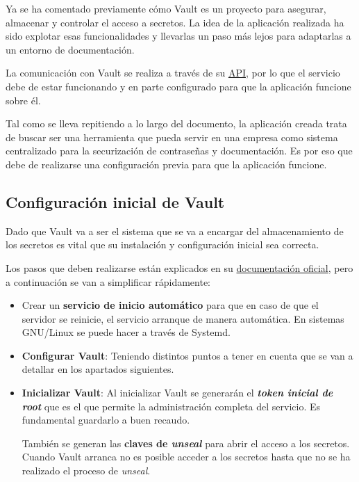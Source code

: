 \documentclass{\ClassPath/viu-tfm-template}
\begin{document}
Ya se ha comentado previamente cómo Vault es un proyecto para asegurar, almacenar y controlar el acceso a secretos. La idea de la aplicación realizada ha sido explotar esas funcionalidades y llevarlas un paso más lejos para adaptarlas a un entorno de documentación.

La comunicación con Vault se realiza a través de su \href{https://developer.hashicorp.com/vault/api-docs}{API}, por lo que el servicio debe de estar funcionando y en parte configurado para que la aplicación funcione sobre él.

Tal como se lleva repitiendo a lo largo del documento, la aplicación creada trata de buscar ser una herramienta que pueda servir en una empresa como sistema centralizado para la securización de contraseñas y documentación. Es por eso que debe de realizarse una configuración previa para que la aplicación funcione.

\subsection{Configuración inicial de Vault}

Dado que Vault va a ser el sistema que se va a encargar del almacenamiento de los secretos es vital que su instalación y configuración inicial sea correcta.

Los pasos que deben realizarse están explicados en su \href{https://developer.hashicorp.com/vault/tutorials/getting-started/getting-started-deploy}{documentación oficial}, pero a continuación se van a simplificar rápidamente:

\begin{itemize}
    \item Crear un \textbf{servicio de inicio automático} para que en caso de que el servidor se reinicie, el servicio arranque de manera automática. En sistemas GNU/Linux se puede hacer a través de Systemd.
    \item \textbf{Configurar Vault}: Teniendo distintos puntos a tener en cuenta que se van a detallar en los apartados siguientes.
    \item \textbf{Inicializar Vault}: Al inicializar Vault se generarán el \textit{\textbf{token inicial de root}} que es el que permite la administración completa del servicio. Es fundamental guardarlo a buen recaudo.

    También se generan las \textbf{claves de \textit{unseal}} para abrir el acceso a los secretos. Cuando Vault arranca no es posible acceder a los secretos hasta que no se ha realizado el proceso de \textit{unseal}.
\end{itemize}
\end{document}
